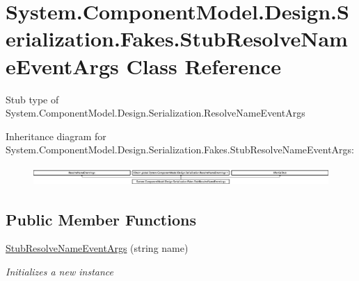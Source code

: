 \hypertarget{class_system_1_1_component_model_1_1_design_1_1_serialization_1_1_fakes_1_1_stub_resolve_name_event_args}{\section{System.\-Component\-Model.\-Design.\-Serialization.\-Fakes.\-Stub\-Resolve\-Name\-Event\-Args Class Reference}
\label{class_system_1_1_component_model_1_1_design_1_1_serialization_1_1_fakes_1_1_stub_resolve_name_event_args}
}


Stub type of System.\-Component\-Model.\-Design.\-Serialization.\-Resolve\-Name\-Event\-Args 


Inheritance diagram for System.\-Component\-Model.\-Design.\-Serialization.\-Fakes.\-Stub\-Resolve\-Name\-Event\-Args\-:\begin{figure}[H]
\begin{center}
\leavevmode
\includegraphics[height=0.734908cm]{class_system_1_1_component_model_1_1_design_1_1_serialization_1_1_fakes_1_1_stub_resolve_name_event_args}
\end{center}
\end{figure}
\subsection*{Public Member Functions}
\begin{DoxyCompactItemize}
\item 
\hyperlink{class_system_1_1_component_model_1_1_design_1_1_serialization_1_1_fakes_1_1_stub_resolve_name_event_args_a7c17391d14ac80924ddf2548a0b8db5e}{Stub\-Resolve\-Name\-Event\-Args} (string name)
\begin{DoxyCompactList}\small\item\em Initializes a new instance\end{DoxyCompactList}\end{DoxyCompactItemize}
